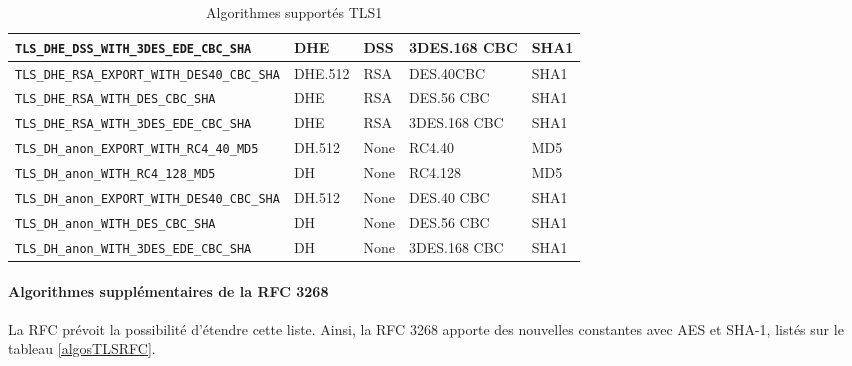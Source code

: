 \begin{table}[H]
\begin{tabularx}{17cm}{|l|l|l|X|l|}
\hline
\verb+TLS_DHE_DSS_WITH_3DES_EDE_CBC_SHA+ & DHE&DSS&3DES.168 CBC&SHA1\\
\hline
\verb+TLS_DHE_RSA_EXPORT_WITH_DES40_CBC_SHA+ & DHE.512&RSA&DES.40CBC&SHA1\\
\hline
\verb+TLS_DHE_RSA_WITH_DES_CBC_SHA+ & DHE&RSA&DES.56 CBC&SHA1\\
\hline
\verb+TLS_DHE_RSA_WITH_3DES_EDE_CBC_SHA+ & DHE&RSA&3DES.168 CBC&SHA1\\
\hline 
\verb+TLS_DH_anon_EXPORT_WITH_RC4_40_MD5+ & DH.512&None&RC4.40&MD5\\
\hline
\verb+TLS_DH_anon_WITH_RC4_128_MD5+ & DH&None&RC4.128&MD5\\
\hline
\verb+TLS_DH_anon_EXPORT_WITH_DES40_CBC_SHA+ & DH.512&None&DES.40 CBC&SHA1\\
\hline
\verb+TLS_DH_anon_WITH_DES_CBC_SHA+& DH	&None	&DES.56	CBC&SHA1\\
\hline
\verb+TLS_DH_anon_WITH_3DES_EDE_CBC_SHA+ & DH	&None	&3DES.168 CBC&	SHA1\\
\hline
\end{tabularx}
\caption{Algorithmes supportés TLS1}
\label{algosTLS1}
\end{table}


\paragraph{Algorithmes supplémentaires de la RFC 3268}
La RFC prévoit la possibilité d'étendre cette liste. Ainsi, la RFC 3268 \cite{rfc3268} apporte des nouvelles constantes avec AES et SHA-1, listés sur le tableau \ref{algosTLSRFC}.
 
